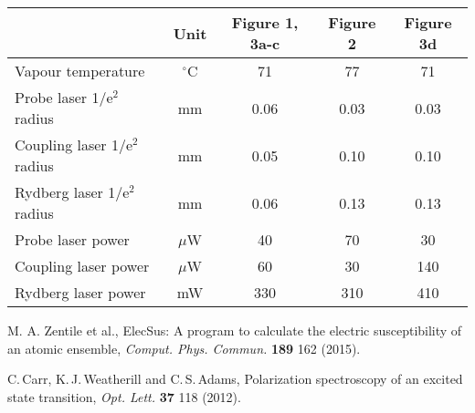 \documentclass[twocolumn,aps,prl,nobibnotes,8pt]{revtex4-1}
\begin{document}
\begin{widetext}
\begin{tabular}{ |l|c|c|c|c| } 
\hline
&Unit & Figure 1, 3a-c & Figure 2 & Figure 3d \\
\hline
Vapour temperature            & $^{\circ}$C & 71  & 77  &  71  \\ 
Probe laser 1/e$^2$ radius    & mm		      & 0.06  & 0.03  &  0.03  \\
Coupling laser 1/e$^2$ radius & mm          & 0.05  & 0.10  &  0.10  \\
Rydberg laser 1/e$^2$ radius  & mm          & 0.06  & 0.13  &  0.13  \\
Probe laser power             & $\mu$W			& 40    & 70    &  30  \\
Coupling laser power          & $\mu$W   		& 60    & 30	  &  140 \\
Rydberg laser power           & mW          & 330   & 310	  &  410 \\
\hline
\end{tabular} 
\end{widetext}

\noindent [47] M. A. Zentile et al., 
{\rm ElecSus: A program to calculate the electric susceptibility of an atomic ensemble,}
{\it Comput. Phys. Commun.} {\bf 189} 162 (2015).

\noindent [48] C.\,Carr, K.\,J.\,Weatherill and C.\,S.\,Adams, %
{\rm Polarization spectroscopy of an excited state transition,} %
{\it Opt. Lett.} {\bf 37} 118 (2012).
\end{document}
